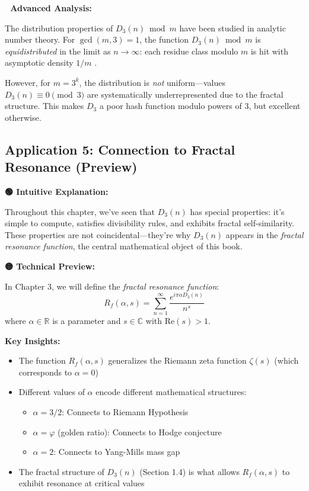 \textbf{🔴 Advanced Analysis:}

The distribution properties of $D_3(n) \bmod m$ have been studied in analytic number theory. For $\gcd(m, 3) = 1$, the function $D_3(n) \bmod m$ is \textit{equidistributed} in the limit as $n \to \infty$: each residue class modulo $m$ is hit with asymptotic density $1/m$ \cite{hardy1979}.

However, for $m = 3^k$, the distribution is \textit{not} uniform—values $D_3(n) \equiv 0 \pmod{3}$ are systematically underrepresented due to the fractal structure. This makes $D_3$ a poor hash function modulo powers of 3, but excellent otherwise.

\subsection{Application 5: Connection to Fractal Resonance (Preview)}

\textbf{🟢 Intuitive Explanation:}

Throughout this chapter, we've seen that $D_3(n)$ has special properties: it's simple to compute, satisfies divisibility rules, and exhibits fractal self-similarity. These properties are not coincidental—they're why $D_3(n)$ appears in the \textit{fractal resonance function}, the central mathematical object of this book.

\textbf{🟡 Technical Preview:}

In Chapter 3, we will define the \textit{fractal resonance function}:
\begin{equation}
R_f(\alpha, s) = \sum_{n=1}^{\infty} \frac{e^{i\pi\alpha D_3(n)}}{n^s}
\end{equation}
where $\alpha \in \mathbb{R}$ is a parameter and $s \in \mathbb{C}$ with $\text{Re}(s) > 1$.

\textbf{Key Insights:}
\begin{itemize}
\item The function $R_f(\alpha, s)$ generalizes the Riemann zeta function $\zeta(s)$ (which corresponds to $\alpha = 0$)
\item Different values of $\alpha$ encode different mathematical structures:
  \begin{itemize}
  \item $\alpha = 3/2$: Connects to Riemann Hypothesis
  \item $\alpha = \varphi$ (golden ratio): Connects to Hodge conjecture
  \item $\alpha = 2$: Connects to Yang-Mills mass gap
  \end{itemize}
\item The fractal structure of $D_3(n)$ (Section 1.4) is what allows $R_f(\alpha, s)$ to exhibit resonance at critical values
\end{itemize}


